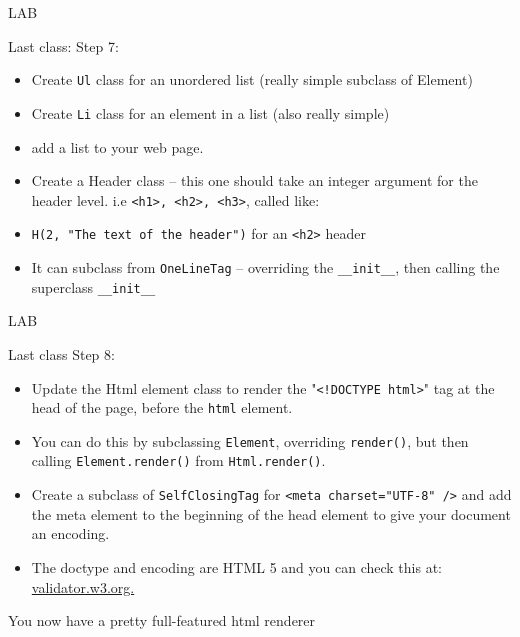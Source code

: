 \documentclass{beamer}
\begin{document}
\begin{frame}[fragile]{LAB}

{\Large Last class: Step 7:}

\begin{itemize}
   \item Create \verb|Ul| class for an unordered list (really simple subclass of Element)
   
   \item Create \verb|Li| class for an element in a list (also really simple)
   
   \item add a list to your web page.
   
   \item Create a Header class -- this one should take an integer argument for the
   header level. i.e \verb|<h1>, <h2>, <h3>|, called like:
   
   \item \verb|H(2, "The text of the header")| for an \verb|<h2>| header
   
   \item It can subclass from \verb|OneLineTag| -- overriding the \verb|__init__|, then calling
       the superclass \verb|__init__|
\end{itemize}

\end{frame}

\begin{frame}[fragile]{LAB}

{\Large Last class Step 8:}

\begin{itemize}
   \item Update the Html element class to render the "\verb|<!DOCTYPE html>|" tag at the
   head of the page, before the \verb|html| element.
   
   \item You can do this by subclassing \verb|Element|, overriding \verb|render()|, but then
   calling \verb|Element.render()| from \verb|Html.render()|.

   \item Create a subclass of \verb|SelfClosingTag| for \verb|<meta charset="UTF-8" />|
   and add the meta element to the beginning of the head element to give your document
   an encoding.
   
   \item The doctype and encoding are HTML 5 and you can check this at:
          \url{validator.w3.org.}

\end{itemize}

\vfill
You now have a pretty full-featured html renderer
\end{frame}
\end{document}
